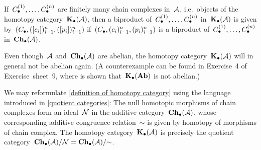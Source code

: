 \begin{remarkdefinition}
\begin{enumerate}
      If~$C_\bullet^{(1)}, \dotsc, C_\bullet^{(n)}$ are finitely many chain complexes in~$\mathcal{A}$, i.e.\ objects of the homotopy category~$\mathbf{K}_\bullet(\mathcal{A})$, then a biproduct of~$C_\bullet^{(1)}, \dotsc, C_\bullet^{(n)}$ in~$\mathbf{K}_\bullet(\mathcal{A})$ is given by~$(C_\bullet, ([c_i])_{i=1}^n, ([p_i])_{i=1}^n)$ if~$(C_\bullet, (c_i)_{i=1}^n, (p_i)_{i=1}^n)$ is a biproduct of~$C_\bullet^{(1)}, \dotsc, C_\bullet^{(n)}$ in~$\mathbf{Ch}_\bullet(\mathcal{A})$.
  \end{enumerate}
\end{remarkdefinition}


\begin{warningnonum}
  Even though~$\mathcal{A}$ and~$\mathbf{Ch}_\bullet(\mathcal{A})$ are abelian, the homotopy category~$\mathbf{K}_\bullet(\mathcal{A})$ will in general not be abelian again.
  (A counterexample can be found in Exercise~4 of Exercise~sheet~9, where is shown that~$\mathbf{K}_\bullet(\mathbf{Ab})$ is not abelian.)
\end{warningnonum}


\begin{remark*}
  We may reformulate \cref{definition of homotopy category} using the language introduced in \cref{quotient categories}:
  The null homotopic morphisms of chain complexes form an ideal~$\mathcal{N}$ in the additive category~$\mathbf{Ch}_\bullet(\mathcal{A})$, whose corresponding additive congruence relation~$\sim$ is given by homotopy of morphisms of chain complex.
  The homotopy category~$\mathbf{K}_\bullet(\mathcal{A})$ is precisely the quotient category~$\mathbf{Ch}_\bullet(\mathcal{A})/\mathcal{N} = \mathbf{Ch}_\bullet(\mathcal{A})/{\sim}$.
\end{remark*}




